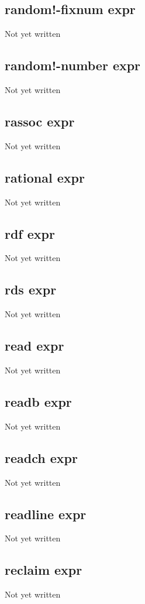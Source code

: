 \documentclass[a4paper,11pt]{article}
\begin{document}
{\subsection{\ttfamily random!-fixnum expr}
   Not yet written

\subsection{\ttfamily random!-number expr}
   Not yet written

\subsection{\ttfamily rassoc expr}
   Not yet written

\subsection{\ttfamily rational expr}
   Not yet written

\subsection{\ttfamily rdf expr}
   Not yet written

\subsection{\ttfamily rds expr}
   Not yet written

\subsection{\ttfamily read expr}
   Not yet written

\subsection{\ttfamily readb expr}
   Not yet written

\subsection{\ttfamily readch expr}
   Not yet written

\subsection{\ttfamily readline expr}
   Not yet written

\subsection{\ttfamily reclaim expr}
   Not yet written

}
\end{document}
